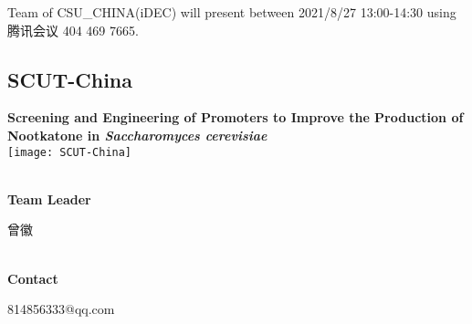 \vfill{}









Team of CSU\_CHINA(iDEC) will present between 2021/8/27 13:00-14:30        using 腾讯会议 404 469 7665.
\newpage


\subsection{\textcolor{Blu}{ SCUT-China } }
\vspace{5mm}
\begin{center}
\large{
  \textbf{ Screening and Engineering of Promoters to Improve the Production of Nootkatone in \textit{Saccharomyces cerevisiae} }\\

  \texttt{[image: SCUT-China]}
}
\end{center}
\textbf{\\Team Leader}

  曾徽


\textbf{\\Contact}

  814856333@qq.com


